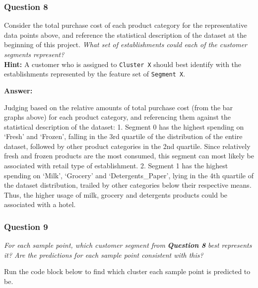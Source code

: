 \documentclass{article}
\begin{document}
    \subsubsection{Question 8}\label{question-8}

Consider the total purchase cost of each product category for the
representative data points above, and reference the statistical
description of the dataset at the beginning of this project. \emph{What
set of establishments could each of the customer segments represent?}\\
\textbf{Hint:} A customer who is assigned to
\texttt{\textquotesingle{}Cluster\ X\textquotesingle{}} should best
identify with the establishments represented by the feature set of
\texttt{\textquotesingle{}Segment\ X\textquotesingle{}}.

    \textbf{Answer:}

Judging based on the relative amounts of total purchase cost (from the
bar graphs above) for each product category, and referencing them
against the statistical description of the dataset: 1. Segment 0 has the
highest spending on `Fresh' and `Frozen', falling in the 3rd quartile of
the distribution of the entire dataset, followed by other product
categories in the 2nd quartile. Since relatively fresh and frozen
products are the most consumed, this segment can most likely be
associated with retail type of establishment. 2. Segment 1 has the
highest spending on `Milk', `Grocery' and `Detergents\_Paper', lying in
the 4th quartile of the dataset distribution, trailed by other
categories below their respective means. Thus, the higher usage of milk,
grocery and detergents products could be associated with a hotel.

    \subsubsection{Question 9}\label{question-9}

\emph{For each sample point, which customer segment from}
\textbf{\emph{Question 8}} \emph{best represents it? Are the predictions
for each sample point consistent with this?}

Run the code block below to find which cluster each sample point is
predicted to be.
\end{document}
